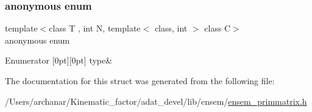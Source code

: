\subsubsection{\texorpdfstring{anonymous enum}{anonymous enum}}
{\footnotesize\ttfamily template$<$class T , int N, template$<$ class, int $>$ class C$>$ \\
anonymous enum}

\begin{DoxyEnumFields}{Enumerator}
[0pt][0pt]{}\mbox{\label{structENSEM_1_1EnsbcIO_3_01PMatrix_3_01T_00_01N_00_01C_01_4_01_4_a2ceec7f204f9f1a7161d1f74e8d0a558ab2030d38e88d687f09c823ba14fc80ef}} 
type&\\
\hline

\end{DoxyEnumFields}


The documentation for this struct was generated from the following file\+:\begin{DoxyCompactItemize}
\item 
/\+Users/archanar/\+Kinematic\+\_\+factor/adat\+\_\+devel/lib/ensem/\mbox{\hyperlink{lib_2ensem_2ensem__primmatrix_8h}{ensem\+\_\+primmatrix.\+h}}\end{DoxyCompactItemize}
